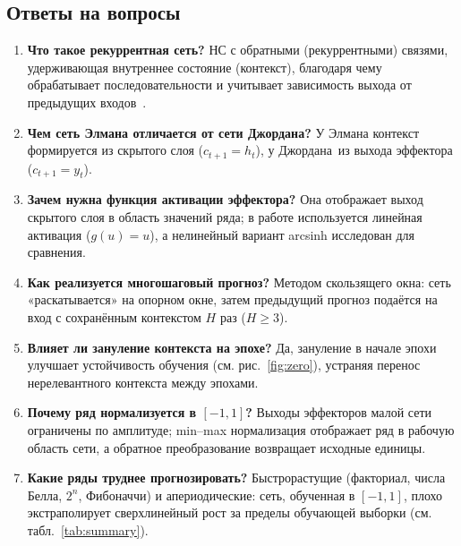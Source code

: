 \subsection{Ответы на вопросы}

\begin{enumerate}
	\item \textbf{Что такое рекуррентная сеть?} НС с обратными (рекуррентными) связями, удерживающая внутреннее состояние (контекст), благодаря чему обрабатывает последовательности и учитывает зависимость выхода от предыдущих входов~\cite{haykin}.
	\item \textbf{Чем сеть Элмана отличается от сети Джордана?} У Элмана контекст формируется из скрытого слоя ($c_{t+1} = h_t$), у Джордана~\mdash  из выхода эффектора ($c_{t+1} = y_t$).
	\item \textbf{Зачем нужна функция активации эффектора?} Она отображает выход скрытого слоя в область значений ряда; в работе используется линейная активация ($g(u)=u$), а нелинейный вариант arcsinh исследован для сравнения.
	\item \textbf{Как реализуется многошаговый прогноз?} Методом скользящего окна: сеть «раскатывается» на опорном окне, затем предыдущий прогноз подаётся на вход с сохранённым контекстом $H$ раз ($H \ge 3$).
	\item \textbf{Влияет ли зануление контекста на эпохе?} Да, зануление в начале эпохи улучшает устойчивость обучения (см. рис.~\ref{fig:zero}), устраняя перенос нерелевантного контекста между эпохами.
	\item \textbf{Почему ряд нормализуется в $[-1, 1]$?} Выходы эффекторов малой сети ограничены по амплитуде; min--max нормализация отображает ряд в рабочую область сети, а обратное преобразование возвращает исходные единицы.
	\item \textbf{Какие ряды труднее прогнозировать?} Быстрорастущие (факториал, числа Белла, $2^n$, Фибоначчи) и апериодические: сеть, обученная в $[-1, 1]$, плохо экстраполирует сверхлинейный рост за пределы обучающей выборки (см. табл.~\ref{tab:summary}).
\end{enumerate}
